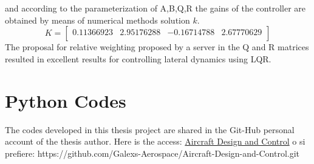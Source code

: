 and according to the parameterization of A,B,Q,R the gains of the controller are obtained by means of numerical methods solution $k$.
\begin{equation}
    K
    =
    \begin{bmatrix}
     0.11366923 &  2.95176288 & -0.16714788 &   2.67770629\\
    \end{bmatrix}
\end{equation}
The proposal for relative weighting proposed by a server in the Q and R matrices resulted in excellent results for controlling lateral dynamics using LQR. 

\section{Python Codes}
\label{a codigos python}
The codes developed in this thesis project are shared in the Git-Hub personal account of the thesis author. Here is the access: 
\href{https://github.com/Galexs-Aerospace/Aircraft-Design-and-Control.git}{Aircraft Design and Control} o si prefiere: https://github.com/Galexs-Aerospace/Aircraft-Design-and-Control.git
